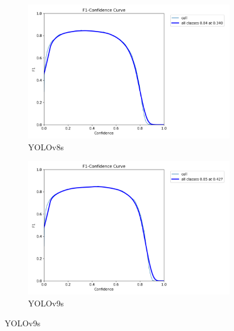 \documentclass[12pt,a4paper,onecolumn,oneside]{report}
\begin{document}
\begin{figure}[H]
  \centering
  \captionsetup[subfigure]{skip=-0.03cm}
  \vspace{-0.6cm}
  \begin{subfigure}[b]{0.48\textwidth}
    \centering
    \includegraphics[width=\textwidth]{figuras/resultados experimentacion/yolov8s/original_test/BoxF1_curve.png}
    \caption{YOLOv8s}
    \label{fig:yolov8s_original_test}
  \end{subfigure}
  \hfill
  \begin{subfigure}[b]{0.48\textwidth}
    \centering
    \includegraphics[width=\textwidth]{figuras/resultados experimentacion/yolov9s/original_test/BoxF1_curve.png}
    \caption{YOLOv9s}
    \label{fig:yolov9s_original_test}
  \end{subfigure}
  

\end{figure}
\end{document}
